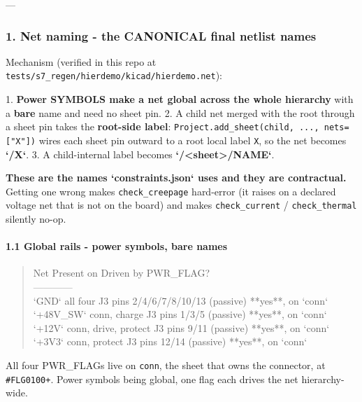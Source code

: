 \documentclass[11pt,a4paper]{article}
\begin{document}
---

\subsubsection*{1. Net naming - the CANONICAL final netlist names}
Mechanism (verified in this repo at \texttt{tests/s7\_regen/hierdemo/kicad/hierdemo.net}):

1. \textbf{Power SYMBOLS make a net global across the whole hierarchy} with a \textbf{bare} name and need no sheet pin. 2. A child net merged with the root through a sheet pin takes the \textbf{root-side label}: \texttt{Project.add\_sheet(child, ..., nets={[}"X"{]})} wires each sheet pin outward to a root local label \texttt{X}, so the net becomes \textbf{`/X`}. 3. A child-internal label becomes \textbf{`/\textless{}sheet\textgreater{}/NAME`}.

\textbf{These are the names `constraints.json` uses and they are contractual.} Getting one wrong makes \texttt{check\_creepage} hard-error (it raises on a declared voltage net that is not on the board) and makes \texttt{check\_current} / \texttt{check\_thermal} silently no-op.

\paragraph*{1.1 Global rails - power symbols, bare names}
\begin{quote}\small\ttfamily\raggedright
\textbar{} Net \textbar{} Present on \textbar{} Driven by \textbar{} PWR\_FLAG? \textbar{}\\
\textbar{}---\textbar{}---\textbar{}---\textbar{}---\textbar{}\\
\textbar{} `GND` \textbar{} all four \textbar{} J3 pins 2/4/6/7/8/10/13 (passive) \textbar{} {*}{*}yes{*}{*}, on `conn` \textbar{}\\
\textbar{} `+48V\_SW` \textbar{} conn, charge \textbar{} J3 pins 1/3/5 (passive) \textbar{} {*}{*}yes{*}{*}, on `conn` \textbar{}\\
\textbar{} `+12V` \textbar{} conn, drive, protect \textbar{} J3 pins 9/11 (passive) \textbar{} {*}{*}yes{*}{*}, on `conn` \textbar{}\\
\textbar{} `+3V3` \textbar{} conn, protect \textbar{} J3 pins 12/14 (passive) \textbar{} {*}{*}yes{*}{*}, on `conn` \textbar{}
\end{quote}
All four PWR\_FLAGs live on \texttt{conn}, the sheet that owns the connector, at \texttt{\#FLG0100+}. Power symbols being global, one flag each drives the net hierarchy-wide.
\end{document}
